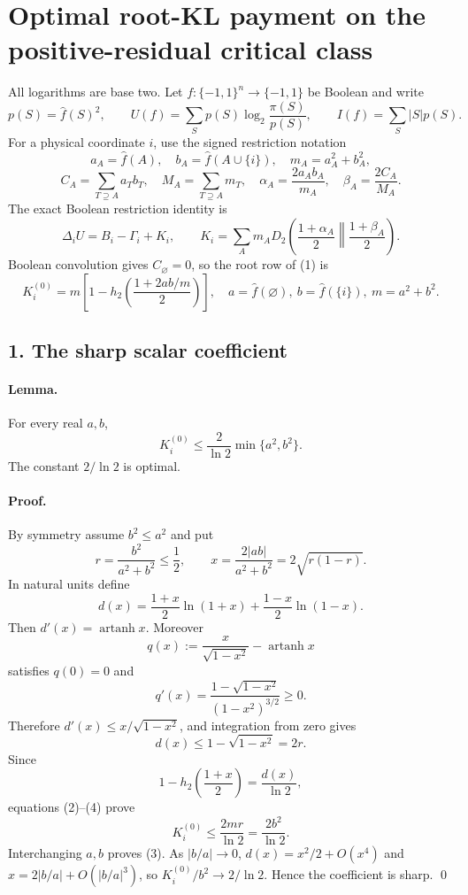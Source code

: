 \section*{Optimal root-KL payment on the positive-residual critical class}

All logarithms are base two.  Let $f:\{-1,1\}^n\to\{-1,1\}$ be
Boolean and write
\[
 p(S)=\widehat f(S)^2,\qquad
 U(f)=\sum_Sp(S)\log_2\frac{\pi(S)}{p(S)},\qquad
 I(f)=\sum_S|S|p(S).
\]
For a physical coordinate $i$, use the signed restriction notation
\[
 a_A=\widehat f(A),\quad b_A=\widehat f(A\cup\{i\}),\quad
 m_A=a_A^2+b_A^2,
\]
\[
 C_A=\sum_{T\supseteq A}a_Tb_T,\quad
 M_A=\sum_{T\supseteq A}m_T,\quad
 \alpha_A=\frac{2a_Ab_A}{m_A},\quad
 \beta_A=\frac{2C_A}{M_A}.
\]
The exact Boolean restriction identity is
\[
 \Delta_iU=B_i-\Gamma_i+K_i,
 \qquad
 K_i=\sum_A m_AD_2\left(\frac{1+\alpha_A}{2}\middle\|
                         \frac{1+\beta_A}{2}\right).       \tag{1}
\]
Boolean convolution gives $C_\varnothing=0$, so the root row of (1) is
\[
 K_i^{(0)}=m\left[1-h_2\left(\frac{1+2ab/m}{2}\right)\right],
 \quad a=\widehat f(\varnothing),\ b=\widehat f(\{i\}),\
 m=a^2+b^2.                                             \tag{2}
\]

\subsection*{1. The sharp scalar coefficient}

\paragraph{Lemma.}
For every real $a,b$,
\[
 \boxed{K_i^{(0)}\le\frac{2}{\ln2}\min\{a^2,b^2\}.}       \tag{3}
\]
The constant $2/\ln2$ is optimal.

\paragraph{Proof.}
By symmetry assume $b^2\le a^2$ and put
\[
 r=\frac{b^2}{a^2+b^2}\le\frac12,
 \qquad x=\frac{2|ab|}{a^2+b^2}=2\sqrt{r(1-r)}.
\]
In natural units define
\[
 d(x)=\frac{1+x}{2}\ln(1+x)+\frac{1-x}{2}\ln(1-x).
\]
Then $d'(x)=\operatorname{artanh}x$.  Moreover
\[
 q(x):=\frac{x}{\sqrt{1-x^2}}-\operatorname{artanh}x
\]
satisfies $q(0)=0$ and
\[
 q'(x)=\frac{1-\sqrt{1-x^2}}{(1-x^2)^{3/2}}\ge0.
\]
Therefore $d'(x)\le x/\sqrt{1-x^2}$, and integration from zero gives
\[
 d(x)\le1-\sqrt{1-x^2}=2r.                            \tag{4}
\]
Since
\[
 1-h_2\left(\frac{1+x}{2}\right)=\frac{d(x)}{\ln2},
\]
equations (2)--(4) prove
\[
 K_i^{(0)}\le\frac{2m r}{\ln2}=\frac{2b^2}{\ln2}.
\]
Interchanging $a,b$ proves (3).  As $|b/a|\to0$,
$d(x)=x^2/2+O(x^4)$ and $x=2|b/a|+O(|b/a|^3)$, so
$K_i^{(0)}/b^2\to2/\ln2$.  Hence the coefficient is sharp. \qed

